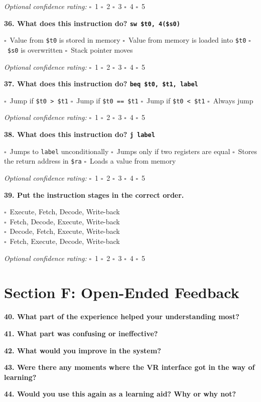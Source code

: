 \documentclass[12pt,a4paper]{article}
\newcommand{\boxmark}{\(\square\)}
\newcommand{\lineanswer}{\vspace{2.5em}\hrulefill}
\newcommand{\confidenceoptional}{%
    \textit{Optional confidence rating:} \boxmark\ 1 \hspace{1em} \boxmark\ 2 \hspace{1em} \boxmark\ 3 \hspace{1em} \boxmark\ 4 \hspace{1em} \boxmark\ 5
}
\begin{document}
\confidenceoptional

\textbf{36. What does this instruction do? \texttt{sw \$t0, 4(\$s0)}}

\boxmark\ Value from \texttt{\$t0} is stored in memory \hspace{1em}
\boxmark\ Value from memory is loaded into \texttt{\$t0} \hspace{1em}
\boxmark\ \texttt{\$s0} is overwritten \hspace{1em}
\boxmark\ Stack pointer moves

\confidenceoptional

\textbf{37. What does this instruction do? \texttt{beq \$t0, \$t1, label}}

\boxmark\ Jump if \texttt{\$t0 > \$t1} \hspace{1em}
\boxmark\ Jump if \texttt{\$t0 == \$t1} \hspace{1em}
\boxmark\ Jump if \texttt{\$t0 < \$t1} \hspace{1em}
\boxmark\ Always jump

\confidenceoptional

\textbf{38. What does this instruction do? \texttt{j label}}

\boxmark\ Jumps to \texttt{label} unconditionally \hspace{1em}
\boxmark\ Jumps only if two registers are equal \hspace{1em}
\boxmark\ Stores the return address in \texttt{\$ra} \hspace{1em}
\boxmark\ Loads a value from memory

\confidenceoptional

\textbf{39. Put the instruction stages in the correct order.}

\boxmark\ Execute, Fetch, Decode, Write-back\\
\boxmark\ Fetch, Decode, Execute, Write-back\\
\boxmark\ Decode, Fetch, Execute, Write-back\\
\boxmark\ Fetch, Execute, Decode, Write-back

\confidenceoptional

\section*{Section F: Open-Ended Feedback}

\textbf{40. What part of the experience helped your understanding most?}
\lineanswer

\textbf{41. What part was confusing or ineffective?}
\lineanswer

\textbf{42. What would you improve in the system?}
\lineanswer

\textbf{43. Were there any moments where the VR interface got in the way of learning?}
\lineanswer

\textbf{44. Would you use this again as a learning aid? Why or why not?}

\vspace{4em}
\hrulefill
\end{document}
